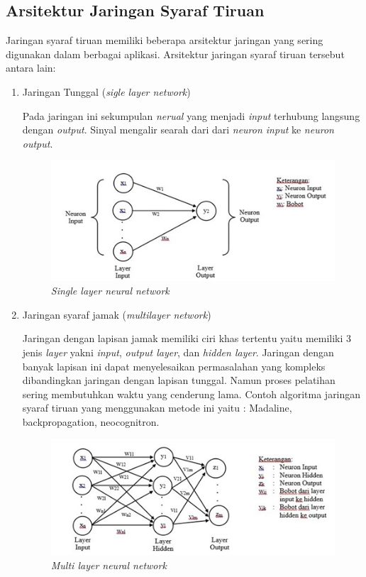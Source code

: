 \subsection{Arsitektur Jaringan Syaraf Tiruan}
Jaringan syaraf tiruan memiliki beberapa arsitektur jaringan yang sering digunakan dalam berbagai aplikasi. Arsitektur jaringan syaraf tiruan tersebut antara lain:
\begin{enumerate}
	\item Jaringan Tunggal (\emph{sigle layer network}) \par 
	Pada jaringan ini sekumpulan \emph{nerual} yang menjadi \emph{input} terhubung langsung dengan \emph{output}. Sinyal mengalir searah dari dari \emph{neuron input} ke \emph{neuron output}.
	 \begin{figure}[H]
		\centering
		\includegraphics{gambar/net-1}
		\caption{\emph{Single layer neural network}\protect\footnotemark}
		\label{JST-1}
	\end{figure}
	\item  Jaringan syaraf jamak (\emph{multilayer network}) \par 
	Jaringan dengan lapisan jamak memiliki ciri khas tertentu yaitu memiliki 3 jenis
	\emph{layer} yakni \emph{input}, \emph{output layer}, dan \emph{hidden layer}. Jaringan dengan banyak
	lapisan ini dapat menyelesaikan permasalahan yang kompleks dibandingkan jaringan
	dengan lapisan tunggal. Namun proses pelatihan sering membutuhkan waktu yang
	cenderung lama. Contoh algoritma jaringan syaraf tiruan yang menggunakan metode
	ini yaitu : Madaline, backpropagation, neocognitron.
	\begin{figure}[H]
		\centering
		\includegraphics{gambar/net-2}
		\caption{\emph{Multi layer neural network}\protect\footnotemark}
		\label{JST-2}
	\end{figure}
\end{enumerate}

